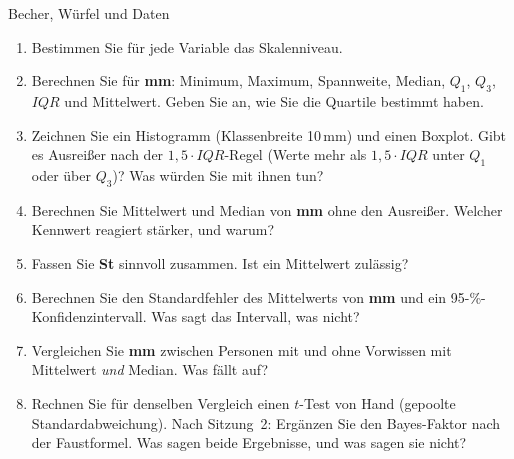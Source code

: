 \begin{uebungsblatt}{Becher, Würfel und Daten}
\begin{enumerate}
  \item Bestimmen Sie für jede Variable das Skalenniveau.
  \item Berechnen Sie für \textbf{mm}: Minimum, Maximum, Spannweite,
    Median, $Q_1$, $Q_3$, $\mathit{IQR}$ und Mittelwert. Geben Sie an,
    wie Sie die Quartile bestimmt haben.
  \item Zeichnen Sie ein Histogramm (Klassenbreite 10\,mm) und einen
    Boxplot. Gibt es Ausreißer nach der $1{,}5\cdot\mathit{IQR}$-Regel
    (Werte mehr als $1{,}5\cdot\mathit{IQR}$ unter $Q_1$ oder über
    $Q_3$)? Was würden Sie mit ihnen tun?
  \item Berechnen Sie Mittelwert und Median von \textbf{mm} ohne den
    Ausreißer. Welcher Kennwert reagiert stärker, und warum?
  \item Fassen Sie \textbf{St} sinnvoll zusammen. Ist ein Mittelwert
    zulässig?
  \item Berechnen Sie den Standardfehler des Mittelwerts von \textbf{mm}
    und ein 95-\%-Konfidenzintervall. Was sagt das Intervall, was nicht?
  \item Vergleichen Sie \textbf{mm} zwischen Personen mit und ohne
    Vorwissen mit Mittelwert \emph{und} Median. Was fällt auf?
  \item Rechnen Sie für denselben Vergleich einen $t$-Test von Hand
    (gepoolte Standardabweichung). Nach Sitzung~2: Ergänzen Sie den
    Bayes-Faktor nach der Faustformel. Was sagen beide Ergebnisse, und was
    sagen sie nicht?
\end{enumerate}
\end{uebungsblatt}

